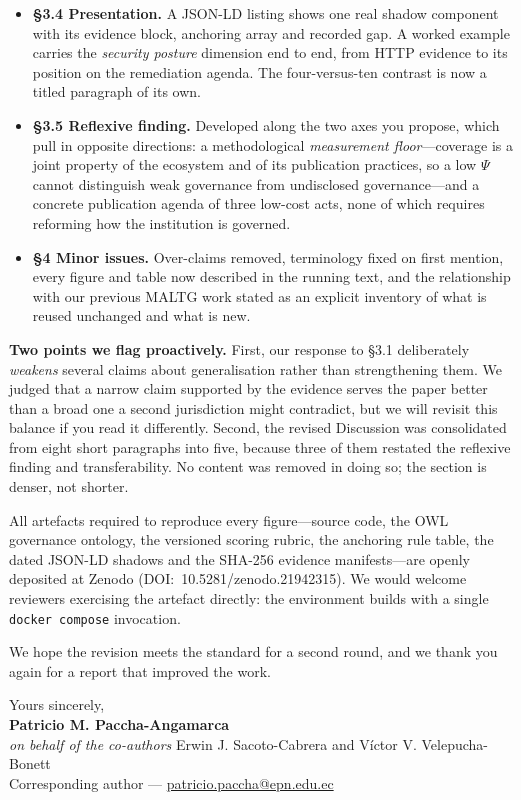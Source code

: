 \documentclass[11pt,a4paper]{article}
\begin{document}
\begin{itemize}
  \item \textbf{§3.4 Presentation.} A JSON-LD listing shows one real shadow component with its evidence block, anchoring array and recorded gap. A worked example carries the \emph{security posture} dimension end to end, from HTTP evidence to its position on the remediation agenda. The four-versus-ten contrast is now a titled paragraph of its own.
  \item \textbf{§3.5 Reflexive finding.} Developed along the two axes you propose, which pull in opposite directions: a methodological \emph{measurement floor}---coverage is a joint property of the ecosystem and of its publication practices, so a low $\Psi$ cannot distinguish weak governance from undisclosed governance---and a concrete publication agenda of three low-cost acts, none of which requires reforming how the institution is governed.
  \item \textbf{§4 Minor issues.} Over-claims removed, terminology fixed on first mention, every figure and table now described in the running text, and the relationship with our previous MALTG work stated as an explicit inventory of what is reused unchanged and what is new.
\end{itemize}

\vspace{4pt}
\textbf{Two points we flag proactively.}
First, our response to §3.1 deliberately \emph{weakens} several claims about generalisation rather than strengthening them. We judged that a narrow claim supported by the evidence serves the paper better than a broad one a second jurisdiction might contradict, but we will revisit this balance if you read it differently. Second, the revised Discussion was consolidated from eight short paragraphs into five, because three of them restated the reflexive finding and transferability. No content was removed in doing so; the section is denser, not shorter.

\vspace{4pt}
All artefacts required to reproduce every figure---source code, the OWL governance ontology, the versioned scoring rubric, the anchoring rule table, the dated JSON-LD shadows and the SHA-256 evidence manifests---are openly deposited at Zenodo (DOI:~10.5281/zenodo.21942315). We would welcome reviewers exercising the artefact directly: the environment builds with a single \texttt{docker compose} invocation.

\vspace{4pt}
We hope the revision meets the standard for a second round, and we thank you again for a report that improved the work.

\vspace{14pt}
{\raggedright
Yours sincerely,\\[20pt]
\textbf{Patricio M. Paccha-Angamarca}\\
\emph{on behalf of the co-authors} Erwin J. Sacoto-Cabrera and Víctor V. Velepucha-Bonett\\
Corresponding author --- \href{mailto:patricio.paccha@epn.edu.ec}{patricio.paccha@epn.edu.ec}\par}
\end{document}
